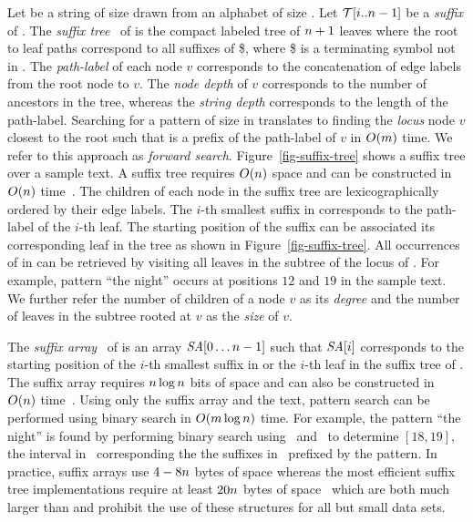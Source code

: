 Let {\col} be a string of size {\collen} drawn from an alphabet {\alphabet} of
size {\alphabetsize}. Let {$\mathcal{T}[i..n-1]$} be a {\it suffix} of {\col}.
The {\it suffix tree}~\cite{w-swat73} of {\col} is the compact labeled
tree of $n+1$ leaves where the root to leaf paths correspond to all suffixes of {\col\$},
where \$ is a terminating symbol not in {\alphabet}. The {\it path-label}
of each node $v$ corresponds to the concatenation of edge labels from the
root node to $v$. The {\it node depth} of $v$ corresponds to the number
of ancestors in the tree, whereas the {\it string depth} corresponds to the
length of the path-label. Searching for a pattern {\pattern} of 
size {\plen} in {\col} translates to finding the {\it locus} node $v$ closest to
the root such that {\pattern} is a prefix of the path-label of $v$ in $O(m)$ time.
We refer to this approach as {\it forward search}.
Figure~\ref{fig-suffix-tree} shows a suffix tree over a sample text. 
A suffix tree requires $O(n)$ space 
and can be constructed in $O(n)$ time~\cite{u-algo95}. The children
of each node in the suffix tree are lexicographically ordered by their edge labels.
The $i$-th smallest suffix in {\col} corresponds to the path-label of the $i$-th 
leaf. The starting position of the suffix can be associated its corresponding
leaf in the tree as shown in Figure~\ref{fig-suffix-tree}. All 
occurrences of {\pattern} in {\col} can be retrieved by visiting all leaves
in the subtree of the locus of {\pattern}. For example, pattern ``the night'' occurs
at positions $12$ and $19$ in the sample text. We further refer the number of children
of a node $v$ as its {\it degree} and the number of leaves in the subtree rooted at $v$
as the {\it size} of $v$.

The {\it suffix array}~\cite{mm-jcomp93} of {\col} is an array $\mbox{\emph{SA}}[0\ldots n-1]$ such
that $\mbox{\emph{SA}}[i]$ corresponds to the starting position of the $i$-th smallest suffix
in {\col} or the $i$-th leaf in the suffix tree of {\col}. The suffix array requires
$n \log n$ bits of space and can also be constructed in $O(n)$ time~\cite{ksb-jacm06}.
Using only the suffix array and the text, pattern search can be performed using binary search
in $O(m \log n)$ time. For example, the pattern ``the night'' is found by performing
binary search using \SA\ and \col\ to determine \SA$[18,19]$, the interval in 
\SA\ corresponding the the suffixes in \col\ prefixed by the pattern.
In practice, suffix arrays use $4-8n$ bytes of space whereas the most efficient
suffix tree implementations require at least $20n$ bytes of space~\cite{k-spe99} which
are both much larger than {\col} and prohibit the use of these structures for all but
small data sets.

